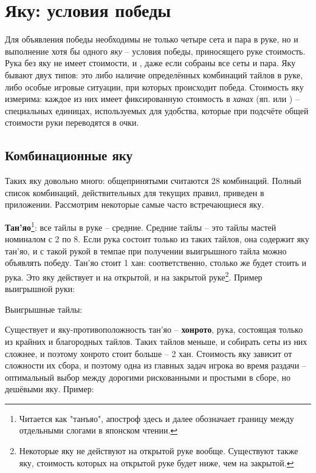 \section{Яку: условия победы}

Для объявления победы необходимы не только четыре сета и пара в руке, но и выполнение хотя бы одного \textit{яку} – условия победы, приносящего руке стоимость. Рука без яку не имеет стоимости, и , даже если собраны все сеты и пара. Яку бывают двух типов: это либо наличие определённых комбинаций тайлов в руке, либо особые игровые ситуации, при которых происходит победа. Стоимость яку измерима: каждое из них имеет фиксированную стоимость в \textit{ханах} (яп.  или ) – специальных единицах, используемых для удобства, которые при подсчёте общей стоимости руки переводятся в очки.

\subsection{Комбинационные яку}

Таких яку довольно много: общепринятыми считаются 28 комбинаций. Полный список комбинаций, действительных для текущих правил, приведен в приложении. Рассмотрим некоторые самые часто встречающиеся яку.

\textbf{Тан'яо}\footnote{Читается как "танъяо", апостроф здесь и далее обозначает границу между отдельными слогами в японском чтении.}: все тайлы в руке – средние. Средние тайлы – это тайлы мастей номиналом с 2 по 8. Если рука состоит только из таких тайлов, она содержит яку тан'яо, и с такой рукой в темпае при получении выигрышного тайла можно объявлять победу. Тан'яо стоит 1 хан: соответственно, столько же будет стоить и рука. Это яку действует и на открытой, и на закрытой руке\footnote{Некоторые яку не действуют на открытой руке вообще. Существуют также яку, стоимость которых на открытой руке будет ниже, чем на закрытой.}. Пример выигрышной руки:

\hfill {}

Выигрышные тайлы: 

Существует и яку-противоположность тан'яо – \textbf{хонрото}, рука, состоящая только из крайних и благородных тайлов. Таких тайлов меньше, и собирать сеты из них сложнее, и поэтому хонрото стоит больше – 2 хан. Стоимость яку зависит от сложности их сбора, и поэтому одна из главных задач игрока во время раздачи – оптимальный выбор между дорогими рискованными и простыми в сборе, но дешёвыми яку. Пример:

